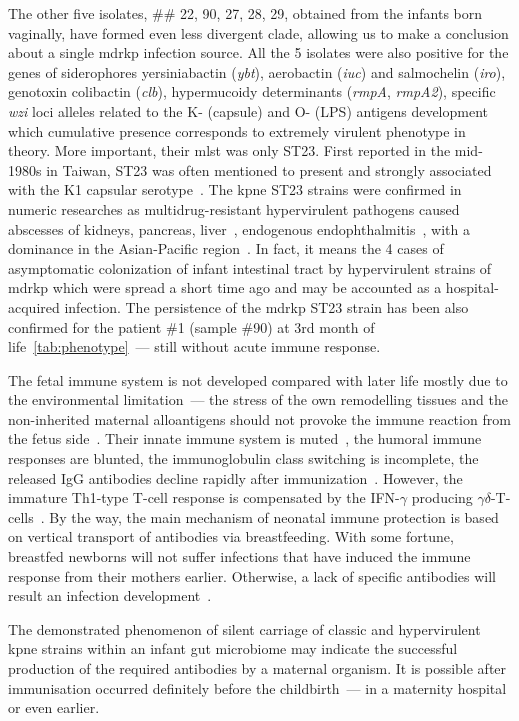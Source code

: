 \documentclass[12pt,a4paper]{article}
\begin{document}
The other five isolates, \#\# 22, 90, 27, 28, 29, obtained from the infants born vaginally,
have formed even less divergent clade, allowing us to make a conclusion about a single \gls{mdrkp} infection source.
All the 5 isolates were also positive for the genes of siderophores yersiniabactin (\textit{ybt}),
aerobactin (\textit{iuc}) and salmochelin (\textit{iro}), genotoxin colibactin (\textit{clb}),
hypermucoidy determinants (\textit{rmpA}, \textit{rmpA2}), specific \textit{wzi} loci alleles related to the
K- (capsule) and O- (LPS) antigens development which cumulative presence corresponds to extremely virulent phenotype
in theory.
More important, their \gls{mlst} was only ST23.
First reported in the mid-1980s in Taiwan, ST23 was often mentioned to present and strongly associated with the
K1 capsular serotype~\cite{Shon2013}.
The \gls{kpne} ST23 strains were confirmed in numeric researches as multidrug-resistant hypervirulent pathogens
caused abscesses of kidneys, pancreas, liver~\cite{Shen2019}, endogenous endophthalmitis~\cite{Xu2018},
with a dominance in the Asian-Pacific region~\cite{Thiry2019}.
In fact, it means the 4 cases of asymptomatic colonization of infant intestinal tract by hypervirulent strains of
\gls{mdrkp} which were spread a short time ago and may be accounted as a hospital-acquired infection.
The persistence of the \gls{mdrkp} ST23 strain has been also confirmed for the patient \#1 (sample \#90)
at 3rd month of life~\ref{tab:phenotype}~--- still without acute immune response.

The fetal immune system is not developed compared with later life mostly due to the environmental limitation~---
the stress of the own remodelling tissues and the non-inherited maternal alloantigens should not provoke
the immune reaction from the fetus side~\cite{Simon2015}.
Their innate immune system is muted~\cite{Haase2010}, the humoral immune responses are blunted,
the immunoglobulin class switching is incomplete, the released IgG antibodies decline rapidly after
immunization~\cite{Pihlgren2006}.
However, the immature Th1-type T-cell response is compensated by the IFN-$\gamma$ producing
$\gamma\delta$-T-cells~\cite{Gibbons2009}.
By the way, the main mechanism of neonatal immune protection is based on vertical transport of antibodies
via breastfeeding.
With some fortune, breastfed newborns will not suffer infections that have induced the immune response
from their mothers earlier.
Otherwise, a lack of specific antibodies will result an infection development~\cite{Dias2017}.

The demonstrated phenomenon of silent carriage of classic and hypervirulent \gls{kpne} strains within an
infant gut microbiome may indicate the successful production of the required antibodies by a maternal organism.
It is possible after immunisation occurred definitely before the childbirth~--- in a maternity hospital or even earlier.
\end{document}
